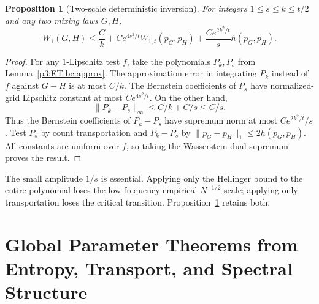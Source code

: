 \documentclass[11pt,a4paper]{article}
\newtheorem{proposition}[theorem]{Proposition}
\theoremstyle{definition}
\theoremstyle{remark}
\numberwithin{equation}{section}
\newcommand{\collectedpart}[1]{%
 \clearpage\part{#1}%
 \setcounter{section}{0}%
 \renewcommand{\thesection}{\Roman{part}.\arabic{section}}%
 \renewcommand{\theHsection}{p\arabic{part}.s\arabic{section}}%
 \renewcommand{\arraystretch}{1}%
}
\begin{document}
\begin{proposition}[Two-scale deterministic inversion]
\label{p3:ET:bc:twoscale}
For integers $1\le s\le k\le t/2$ and any two mixing laws $G,H$,
\begin{equation}\label{p3:ET:bc:twoscaleineq}
 W_1(G,H)\le \frac Ck
       +Ce^{4s^2/t}W_{1,t}(p_G,p_H)
       +\frac{Ce^{2k^2/t}}s h(p_G,p_H).
\end{equation}
\end{proposition}
\begin{proof}
For any $1$-Lipschitz test $f$, take the polynomials $P_k,P_s$ from
Lemma~\ref{p3:ET:bc:approx}. The approximation error in integrating $P_k$
instead of $f$ against $G-H$ is at most $C/k$. The Bernstein coefficients
of $P_s$ have normalized-grid Lipschitz constant at most $Ce^{4s^2/t}$.
On the other hand,
\[
 \|P_k-P_s\|_\infty\le C/k+C/s\le C/s.
\]
Thus the Bernstein coefficients of $P_k-P_s$ have supremum norm at most
$Ce^{2k^2/t}/s$. Test $P_s$ by count transportation and $P_k-P_s$ by
$\|p_G-p_H\|_1\le2h(p_G,p_H)$. All constants are uniform over $f$,
so taking the Wasserstein dual supremum proves the result.
\end{proof}

The small amplitude $1/s$ is essential. Applying only the Hellinger
bound to the entire polynomial loses the low-frequency empirical
$N^{-1/2}$ scale; applying only transportation loses the critical
transition. Proposition~\ref{p3:ET:bc:twoscale} retains both.




\collectedpart{Global Parameter Theorems from Entropy, Transport, and Spectral Structure}\label{part:4}

\begin{abstract}
We transfer likelihood entropy, two-scale inversion, canonical singular
germs, and spectral optimization to four precisely specified problems.
The main statistical theorem determines the Wasserstein minimax risk
for Poisson population recovery for every sample size $N\ge3$ and every
known support radius $B>0$, and proves that every ordinary unrestricted
Poisson mixture maximum-likelihood estimator attains it. An exact
occupancy channel converts Poisson kernels into binomial kernels while
preserving the posterior entropy argument for the original estimator.
A second global theorem determines the physical-density connection
coefficients for the Jacobi trace for every $N\ge1$, $a,b>-1$, and
$\beta\ge0$, including all resonances. Convergent corner integrals and
a shifted auxiliary differential system give parameter-continuous
continuation without singular normalization factors.
For every connected block graph, we compute both optimal designs and
prove that the worst $D$-optimal/$A$-optimal resistance ratio has leading
constant $1/(4\sqrt2)$ times $\sqrt n$.
Finally, in a known two-Gaussian dictionary, we prove that ordinary
likelihood incurs contamination error of order $\sqrt\varepsilon$,
whereas the minimax error is of order $\varepsilon$, with matching
finite-sample bounds and an exact population bias equation.
The supporting binomial approximation arguments are reproduced, and
the unresolved extensions are stated explicitly.
\end{abstract}
\end{document}
